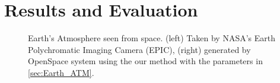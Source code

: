 \documentclass[journal]{vgtc}                %
\begin{document}





\vspace*{-2mm} 
\section{Results and Evaluation}

\begin{figure}[t]
  \centering %
  \vspace*{-6mm}
  \caption{Earth's Atmosphere seen from space. (left) Taken by NASA's Earth Polychromatic Imaging Camera (EPIC), (right) generated by OpenSpace system using the our method with the parameters in \autoref{sec:Earth_ATM}.}
  \label{fig:Earth-comparison}
  \vspace*{-2mm}
\end{figure}
\end{document}
